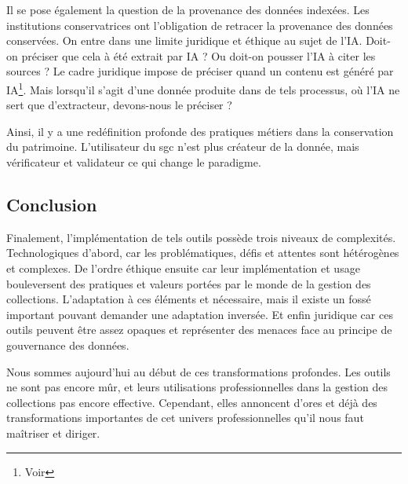 Il se pose également la question de la provenance des données indexées. Les institutions conservatrices ont l'obligation de retracer la provenance des données conservées. On entre dans une limite juridique et éthique au sujet de l'\gls{IA}. Doit-on préciser que cela à été extrait par \gls{IA} ? Ou doit-on pousser l'\gls{IA} à citer les sources ? Le cadre juridique impose de préciser quand un contenu est généré par \gls{IA}\footnote{Voir }. Mais lorsqu'il s'agit d'une donnée produite dans de tels processus, où l'\gls{IA} ne sert que d'extracteur, devons-nous le préciser ?  

Ainsi, il y a une redéfinition profonde des pratiques métiers dans la conservation du patrimoine. L'utilisateur du \gls{sgc} n'est plus créateur de la donnée, mais vérificateur et validateur ce qui change le paradigme.\newline

\subsection{Conclusion}

Finalement, l'implémentation de tels outils possède trois niveaux de complexités. Technologiques d'abord, car les problématiques, défis et attentes sont hétérogènes et complexes. De l'ordre éthique ensuite car leur implémentation et usage bouleversent des pratiques et valeurs portées par le monde de la gestion des collections. L’adaptation à ces éléments et nécessaire, mais il existe un fossé important pouvant demander une adaptation inversée. Et enfin juridique car ces outils peuvent être assez opaques et représenter des menaces face au principe de gouvernance des données. 

Nous sommes aujourd'hui au début de ces transformations profondes. Les outils ne sont pas encore mûr, et leurs utilisations professionnelles dans la gestion des collections pas encore effective. Cependant, elles annoncent d'ores et déjà des transformations importantes de cet univers professionnelles qu'il nous faut maîtriser et diriger.
